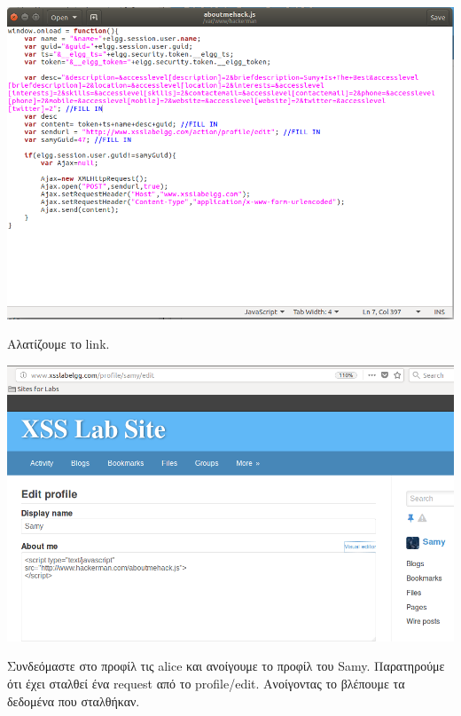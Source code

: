 \begin{center}
			\includegraphics[width=1\textwidth]{image/5.1.PNG}		
\end{center}
\noindent
Αλατίζουμε το link.
\begin{center}
			\includegraphics[width=1\textwidth]{image/5.3.PNG}		
\end{center}
\noindent
Συνδεόμαστε στο προφίλ τις alice και ανοίγουμε το προφίλ του Samy.
Παρατηρούμε ότι έχει σταλθεί ένα request από το profile/edit.
Ανοίγοντας το βλέπουμε τα δεδομένα που σταλθήκαν.

